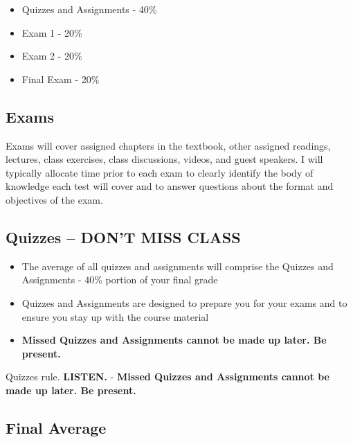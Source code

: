 \documentclass[
]{book}
\providecommand{\tightlist}{%
  \setlength{\itemsep}{0pt}\setlength{\parskip}{0pt}}
\theoremstyle{definition}
\theoremstyle{definition}
\theoremstyle{definition}
\theoremstyle{definition}
\theoremstyle{remark}
\begin{document}
\begin{itemize}
\tightlist
\item
  Quizzes and Assignments - 40\%
\item
  Exam 1 - 20\%
\item
  Exam 2 - 20\%
\item
  Final Exam - 20\%
\end{itemize}

\hypertarget{exams}{%
\subsection{Exams}\label{exams}}

Exams will cover assigned chapters in the textbook, other assigned readings, lectures, class exercises, class discussions, videos, and guest speakers. I will typically allocate time prior to each exam to clearly identify the body of knowledge each test will cover and to answer questions about the format and objectives of the exam.

\hypertarget{quizzes-dont-miss-class}{%
\subsection{\texorpdfstring{Quizzes -- \textbf{DON'T MISS CLASS}}{Quizzes -- DON'T MISS CLASS}}\label{quizzes-dont-miss-class}}

\begin{itemize}
\tightlist
\item
  The average of all quizzes and assignments will comprise the Quizzes and Assignments - 40\% portion of your final grade
\item
  Quizzes and Assignments are designed to prepare you for your exams and to ensure you stay up with the course material
\item
  \textbf{Missed Quizzes and Assignments cannot be made up later. Be present.}
\end{itemize}

Quizzes rule. \textbf{LISTEN.}
- \textbf{Missed Quizzes and Assignments cannot be made up later. Be present.}

\hypertarget{final-average}{%
\subsection{Final Average}\label{final-average}}
\end{document}
